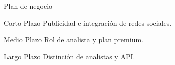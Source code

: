\documentclass[12pt]{beamer}
\begin{document}
		\begin{frame}{Plan de negocio}
			\begin{block}{Corto Plazo}
				Publicidad e integración de redes sociales.
			\end{block}
			\begin{block}{Medio Plazo}
				Rol de analista y plan premium.
			\end{block}
			\begin{block}{Largo Plazo}
				Distinción de analistas y API.
			\end{block}
		\end{frame}
\end{document}
